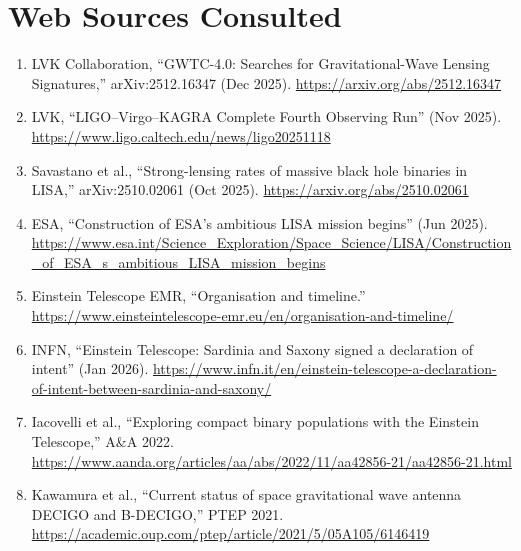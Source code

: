 \documentclass[11pt]{article}
\begin{document}
\section*{Web Sources Consulted}

\begin{enumerate}
\item LVK Collaboration, ``GWTC-4.0: Searches for Gravitational-Wave
  Lensing Signatures,'' arXiv:2512.16347 (Dec 2025).
  \url{https://arxiv.org/abs/2512.16347}
\item LVK, ``LIGO--Virgo--KAGRA Complete Fourth Observing Run''
  (Nov 2025). \url{https://www.ligo.caltech.edu/news/ligo20251118}
\item Savastano et al., ``Strong-lensing rates of massive black hole
  binaries in LISA,'' arXiv:2510.02061 (Oct 2025).
  \url{https://arxiv.org/abs/2510.02061}
\item ESA, ``Construction of ESA's ambitious LISA mission begins''
  (Jun 2025). \url{https://www.esa.int/Science_Exploration/Space_Science/LISA/Construction_of_ESA_s_ambitious_LISA_mission_begins}
\item Einstein Telescope EMR, ``Organisation and timeline.''
  \url{https://www.einsteintelescope-emr.eu/en/organisation-and-timeline/}
\item INFN, ``Einstein Telescope: Sardinia and Saxony signed a
  declaration of intent'' (Jan 2026).
  \url{https://www.infn.it/en/einstein-telescope-a-declaration-of-intent-between-sardinia-and-saxony/}
\item Iacovelli et al., ``Exploring compact binary populations with
  the Einstein Telescope,'' A\&A 2022.
  \url{https://www.aanda.org/articles/aa/abs/2022/11/aa42856-21/aa42856-21.html}
\item Kawamura et al., ``Current status of space gravitational wave
  antenna DECIGO and B-DECIGO,'' PTEP 2021.
  \url{https://academic.oup.com/ptep/article/2021/5/05A105/6146419}
\end{enumerate}
\end{document}
